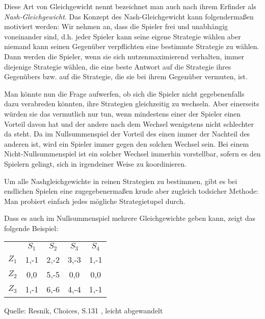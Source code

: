 Diese Art von Gleichgewicht nennt bezeichnet man auch nach ihrem Erfinder als
{\em Nash-Gleichgewicht}. Das Konzept des Nash-Gleichgewicht kann folgendermaßen
motiviert werden: Wir nehmen an, dass die Spieler frei und unabhängig
voneinander sind, d.h. jeder Spieler kann seine eigene Strategie wählen aber
niemand kann seinen Gegenüber verpflichten eine bestimmte Strategie zu wählen.
Dann werden die Spieler, wenn sie sich nutzenmaximierend verhalten, immer
diejenige Strategie wählen, die eine beste Antwort auf die Strategie ihres
Gegenübers bzw. auf die Strategie, die sie bei ihrem Gegenüber vermuten, ist. 

Man könnte nun die Frage aufwerfen, ob sich die Spieler nicht gegebenenfalls
dazu verabreden könnten, ihre Strategien gleichzeitig zu wechseln. Aber
einerseits würden sie das vermutlich nur tun, wenn mindestens einer der Spieler
einen Vorteil davon hat und der andere nach dem Wechsel wenigstens nicht
schlechter da steht. Da im Nullsummenspiel der Vorteil des einen immer der Nachteil 
des anderen ist, wird ein Spieler immer gegen den solchen Wechsel sein.
Bei einem Nicht-Nullsummenspiel ist ein solcher Wechsel immerhin vorstellbar,
sofern es den Spielern gelingt, sich in irgendeiner Weise zu koordinieren.

Um alle Nashgleichgewichte in reinen Strategien zu bestimmen, gibt es bei
endlichen Spielen eine zugegebenermaßen krude aber zugleich todsicher Methode:
Man probiert einfach jedes mögliche Strategietupel durch.

Dass es auch im Nullsummenspiel mehrere Gleichgewichte geben kann, zeigt das
folgende Beispiel:

\begin{center}
\setlength{\parskip}{0.5cm}
\begin{tabular}{c|c|c|c|c|}
\multicolumn{1}{c}{} & 
\multicolumn{1}{c}{$S_1$} &
\multicolumn{1}{c}{$S_2$} &
\multicolumn{1}{c}{$S_3$} &
\multicolumn{1}{c}{$S_4$} \\ \cline{2-5}

$Z_1$ & 1,-1 & 2,-2 & 3,-3 & 1,-1  \\ \cline{2-5}
$Z_2$ & 0,0  & 5,-5 & 0,0  & 0,0 \\ \cline{2-5}
$Z_3$ & 1,-1 & 6,-6 & 4,-4 & 1,-1 \\ \cline{2-5}

\end{tabular}

{\footnotesize Quelle: Resnik, Choices, S.131 \cite[]{resnik:1987}, leicht
abgewandelt}
\end{center}


